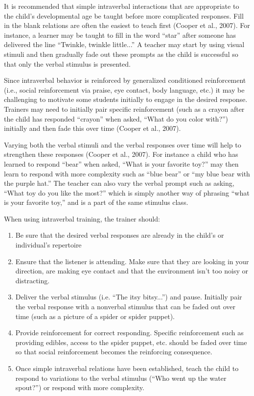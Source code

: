 It is recommended that simple intraverbal interactions that are appropriate to the child's developmental age be taught before more complicated responses.  Fill in the blank relations are often the easiest to teach first (Cooper et al., 2007).  For instance, a learner may be taught to fill in the word ``star'' after someone has delivered the line ``Twinkle, twinkle little...''    A teacher may start by using visual stimuli and then gradually fade out these prompts as the child is successful so that only the verbal stimulus is presented.  

Since intraverbal behavior is reinforced by generalized conditioned reinforcement (i.e., social reinforcement via praise, eye contact, body language, etc.) it may be challenging to motivate some students initially to engage in the desired response.  Trainers may need to initially pair specific reinforcement (such as a crayon after the child has responded ``crayon'' when asked, ``What do you color with?'') initially and then fade this over time (Cooper et al., 2007). 

Varying both the verbal stimuli and the verbal responses over time will help to strengthen these responses (Cooper et al., 2007).   For instance a child who has learned to respond ``bear'' when asked, ``What is your favorite toy?'' may then learn to respond with more complexity such as ``blue bear'' or ``my blue bear with the purple hat.''  The teacher can also vary the verbal prompt such as asking, ``What toy do you like the most?'' which is simply another way of phrasing ``what is your favorite toy,'' and is a part of the same stimulus class.    

When using intraverbal training, the trainer should:
\begin{enumerate}
\item Be sure that the desired verbal responses are already in the child's or individual's repertoire
\item Ensure that the listener is attending.  Make sure that they are looking in your direction, are making eye contact and that the environment isn't too noisy or distracting.
\item Deliver the verbal stimulus (i.e. ``The itsy bitsy...'') and pause.  Initially pair the verbal response with a nonverbal stimulus that can be faded out over time (such as a picture of a spider or spider puppet).
\item Provide reinforcement for correct responding. Specific reinforcement such as providing edibles, access to the spider puppet, etc. should be faded over time so that social reinforcement becomes the reinforcing consequence.  
\item Once simple intraverbal relations have been established, teach the child to respond to variations to the verbal stimulus (``Who went up the water spout?'') or respond with more complexity.    
\end{enumerate}
%
